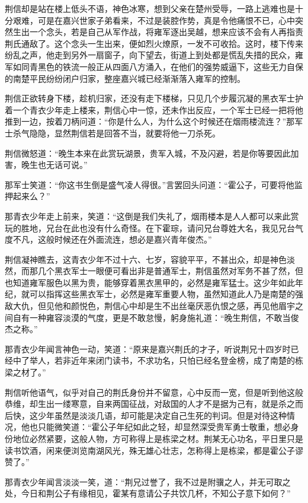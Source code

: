 荆信却是站在楼上低头不语，神色冰寒，想到父亲在楚州受辱，一路上逃难也是十分艰难，可是在嘉兴世家子弟看来，不过是装腔作势，真是令他痛恨不已，心中突然生出一个念头，若是自己从军作战，将雍军逐出吴越，想来应该不会有人再指责荆氏通敌了。这个念头一生出来，便如烈火燎原，一发不可收拾。这时，楼下传来纷乱之声，他走到另外一扇窗子，向下望去，街道上到处都是慌乱失措的民众，雍军如同青黑色的铁流一般正从四面八方涌入，在他们的强势威逼下，这些无力自保的南楚平民纷纷闭户归家，整座嘉兴城已经渐渐落入雍军的控制。

荆信正欲转身下楼，趁机归家，还没有走下楼梯，只见几个步履沉凝的黑衣军士护着一个青衣少年走上楼来，荆信心中一惊，还未作出反应，一个军士已经一把将他推到一边，按着刀柄问道：“你是什么人，为什么这个时候还在烟雨楼流连？”那军士杀气隐隐，显然荆信若是回答不当，就要将他一刀杀死。

荆信微怒道：“晚生本来在此赏玩湖景，贵军入城，不及闪避，若是你等要因此加害，晚生也无话可说。”

那军士笑道：“你这书生倒是盛气凌人得很。”言罢回头问道：“霍公子，可要将他监押起来么？”

那青衣少年走上前来，笑道：“这倒是我们失礼了，烟雨楼本是人人都可以来此赏玩的胜地，兄台在此也没有什么奇怪。在下霍琮，请问兄台尊姓大名，我见兄台气度不凡，这般时候还在外面流连，想必是嘉兴青年俊杰。”

荆信凝神瞧去，这青衣少年不过十六、七岁，容貌平平，不甚出众，却是神色淡然，而那几个黑衣军士一眼便可看出非是普通军士，荆信虽然对军务不甚了然，但也知道雍军服色以黑为贵，能够穿着黑衣黑甲的，必然是雍军猛士。这少年如此年纪，就可以指挥这些黑衣军士，必然是雍军重要人物，虽然知道此人乃是南楚的强敌大仇，但见他和颜悦色，荆信心中却是生不出丝毫厌恶仇恨之感，再见他眉宇之间自有一种雍容淡漠的气度，更是不敢怠慢，躬身施礼道：“晚生荆信，不敢当俊杰之称。”

那青衣少年闻言神色一动，笑道：“原来是嘉兴荆氏的才子，听说荆兄十四岁时已经中了举人，若非近年来闭门读书，不求功名，只怕已经名登金榜，成了南楚的栋梁之材了。”

荆信听他语气，似乎对自己的荆氏身份并不留意，心中反而一宽，但是听到他这般恭维，却生出一缕寒意，自来两国征战，对敌国的人才不是据为己有，就是杀之而后快，这少年虽然是淡淡几语，却可能是决定自己生死的判词。但是对待这种情况，他也只能微笑道：“霍公子年纪如此之轻，却显然深受贵军勇士敬重，想必身份地位必然紧要，这般人物，方可称得上是栋梁之材。荆某无心功名，平日里只是读书饮酒，闲来便浏览南湖风光，殊无雄心壮志，怎称得上是栋梁，都是霍公子谬赞了。”

那青衣少年闻言淡淡一笑，道：“荆兄过誉了，我不过是附骥之人，并无可取之处，今日和荆公子有缘相见，霍某有意请公子共饮几杯，不知公子意下如何？”

